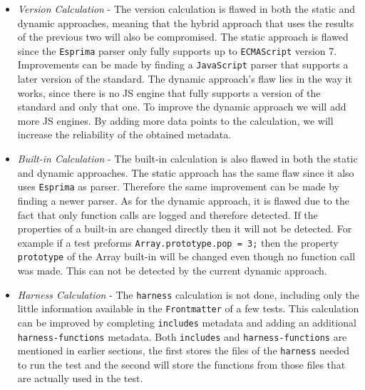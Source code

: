 \documentclass[runningheads]{llncs}
\begin{document}
\begin{itemize}
\item \emph{Version Calculation} - The version calculation is flawed in both the static and dynamic approaches, meaning that the hybrid approach that uses the results of the previous two will also be compromised. The static approach is flawed since the \texttt{Esprima} parser only fully supports up to \texttt{ECMAScript} version 7. Improvements can be made by finding a \texttt{JavaScript} parser that supports a later version of the standard. The dynamic approach's flaw lies in the way it works, since there is no JS engine that fully supports a version of the standard and only that one. To improve the dynamic approach we will add more JS engines. By adding more data points to the calculation, we will increase the reliability of the obtained metadata.
%
\item \emph{Built-in Calculation} - The built-in calculation is also flawed in both the static and dynamic approaches. The static approach has the same flaw since it also uses \texttt{Esprima} as parser. Therefore the same improvement can be made by finding a newer parser. As for the dynamic approach, it is flawed due to the fact that only function calls are logged and therefore detected. If the properties of a built-in are changed directly then it will not be detected. For example if a test preforms \texttt{Array.prototype.pop = 3;} then the property \texttt{prototype} of the Array built-in will be changed even though no function call was made. This can not be detected by the current dynamic approach.
%
\item \emph{Harness Calculation} - The \texttt{harness} calculation is not done, including only the little information available in the \texttt{Frontmatter} of a few tests. This calculation can be improved by completing \texttt{includes} metadata and adding an additional \texttt{harness-functions} metadata. Both \texttt{includes} and \texttt{harness-functions} are mentioned in earlier sections, the first stores the files of the \texttt{harness} needed to run the test and the second will store the functions from those files that are actually used in the test.
\end{itemize}
\end{document}
